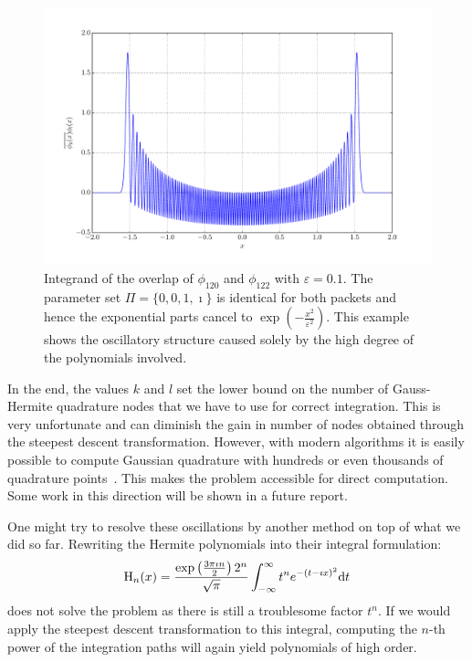 \documentclass[a4paper,10pt]{article}
\begin{document}
\begin{figure}[h!]
  \centering
  \includegraphics[width=0.8\linewidth]{./fig/poly_oscillations.pdf}
  \caption{Integrand of the overlap of $\phi_{120}$ and $\phi_{122}$
  with $\varepsilon=0.1$. The parameter set $\Pi = \{0,0,1,\imath\}$
  is identical for both packets and hence the exponential parts cancel
  to $\exp(-\frac{x^2}{\varepsilon^2})$. This example shows the oscillatory
  structure caused solely by the high degree of the polynomials involved.}
  \label{fig:polynomials_oscillations}
\end{figure}

In the end, the values $k$ and $l$ set the lower bound on the number of Gauss-Hermite
quadrature nodes that we have to use for correct integration. This is very unfortunate
and can diminish the gain in number of nodes obtained through the steepest descent
transformation. However, with modern algorithms it is easily possible to compute
Gaussian quadrature with hundreds or even thousands of quadrature points~\cite{GLR,TTS}.
This makes the problem accessible for direct computation. Some work in this direction
will be shown in a future report.

One might try to resolve these oscillations by another method on top
of what we did so far. Rewriting the Hermite polynomials into their integral formulation:
\begin{equation*}
  \operatorname{H}_n(x) =
  \frac{\exp\left(\frac{3\pi \imath n}{2}\right) 2^n}{\sqrt{\pi}}
  \int_{-\infty}^{\infty} t^n e^{-{(t - \imath x)}^2} \mathrm{d}t
\end{equation*}
does not solve the problem as there is still a troublesome factor $t^n$.
If we would apply the steepest descent transformation to this integral, computing
the $n$-th power of the integration paths will again yield polynomials of high order.
\end{document}
